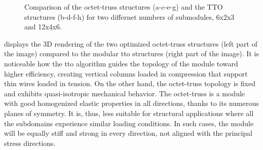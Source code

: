 \begin{figure}
    \hfill
    \bigskip
    \hfill
    \caption{Comparison of the octet-truss structures (a-c-e-g) and the TTO structures (b-d-f-h) for two differnet numbers of submodules, 6x2x3 and 12x4x6.}
    \label{fig:05_octet_results}
\end{figure}

 displays the 3D rendering of the two optimized octet-truss structures (left part of the image) compared to the modular \gls{tto} structures (right part of the image). It is noticeable how the \gls{tto} algorithm guides the topology of the module toward higher efficiency, creating vertical columns loaded in compression that support thin wires loaded in tension. On the other hand, the octet-truss topology is fixed and exhibits quasi-isotropic mechanical behavior. The octet-truss is a module with good homogenized elastic properties in all directions, thanks to its numerous planes of symmetry. It is, thus, less suitable for structural applications where all the subdomains experience similar loading conditions. In such cases, the module will be equally stiff and strong in every direction, not aligned with the principal stress directions.

